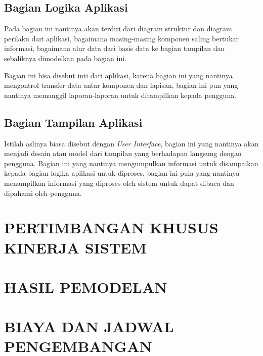 \documentclass[pdftex,12pt, oneside]{article}
\begin{document}
\subsection{Bagian Logika Aplikasi}

Pada bagian ini nantinya akan terdiri dari diagram struktur dan diagram perilaku dari aplikasi, bagaimana masing-masing komponen saling bertukar informasi, bagaimana alur data dari basis data ke bagian tampilan dan sebaliknya dimodelkan pada bagian ini.

Bagian ini bisa disebut inti dari aplikasi, karena bagian ini yang nantinya mengontrol transfer data antar komponen dan lapisan, bagian ini pun yang nantinya memanggil laporan-laporan untuk ditampilkan kepada pengguna.

\subsection{Bagian Tampilan Aplikasi}

Istilah aslinya biasa disebut dengan \textit{User Interface}, bagian ini yang nantinya akan menjadi desain atau model dari tampilan yang berhadapan langsung dengan pengguna. Bagian ini yang nantinya mengumpulkan informasi untuk disampaikan kepada bagian logika aplikasi untuk diproses, bagian ini pula yang nantinya menampilkan informasi yang diproses oleh sistem untuk dapat dibaca dan dipahami oleh pengguna.

\section{PERTIMBANGAN KHUSUS KINERJA SISTEM}



\section{HASIL PEMODELAN}


\section{BIAYA DAN JADWAL PENGEMBANGAN}
\end{document}
